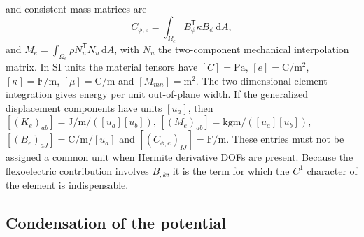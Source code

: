 and consistent mass matrices are
\begin{equation}
  C_{\phi,e}=\int_{\Omega_e}B_\phi^{\mathsf T}\kappa B_\phi\,\mathrm{d}A ,
  \label{eq:Cphi}
\end{equation}
and $M_e=\int_{\Omega_e}\rho N_u^{\mathsf T}N_u\,\mathrm{d}A$,
with $N_u$ the two-component mechanical interpolation matrix. In SI
units the material tensors have $[C]=\si{\pascal}$,
$[e]=\si{\coulomb\per\square\meter}$,
$[\kappa]=\si{\farad\per\meter}$,
$[\mu]=\si{\coulomb\per\meter}$ and $[M_{mn}]=\si{\square\meter}$.
The two-dimensional element integration gives energy per unit out-of-plane
width. If the generalized displacement components have units $[u_a]$, then
$[(K_e)_{ab}]=\si{\joule\per\meter}/([u_a][u_b])$,
$[(M_e)_{ab}]=\si{\kilogram\meter}/([u_a][u_b])$,
$[(B_e)_{aJ}]=\si{\coulomb\per\meter}/[u_a]$ and
$[(C_{\phi,e})_{IJ}]=\si{\farad\per\meter}$. These entries must not
be assigned a common unit when Hermite derivative DOFs are present.
Because the flexoelectric contribution involves $B_{,k}$, it is the term for which the
$C^1$ character of the element is indispensable.

\FloatBarrier
\subsection{Condensation of the potential}
\label{sec:condensation}

